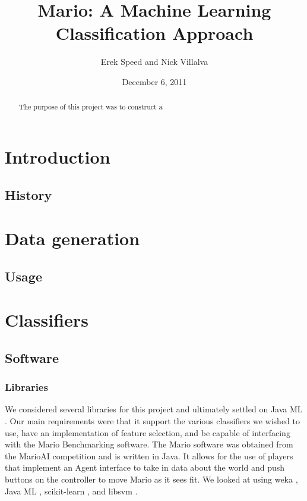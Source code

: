 \documentclass[]{article}   %
\begin{document}
\title{Mario: A Machine Learning Classification Approach}   %

\author{Erek Speed and Nick Villalva}         %
\date{December 6, 2011}    %
\maketitle

\begin{abstract}
 The purpose of this project was to construct a 
\end{abstract}

\section{Introduction}     %
\subsection{History}       %

\section{Data generation}     %
\subsection{Usage}         %

\section{Classifiers}
\subsection{Software}
\subsubsection{Libraries}
We considered several libraries for this project and ultimately settled on Java ML \cite{javaml}. Our main requirements were that it support the various classifiers we wished to use, have an implementation of feature selection, and be capable of interfacing with the Mario Benchmarking \cite{mariobenchmark} software. The Mario software was obtained from the MarioAI competition and is written in Java. It allows for the use of players that implement an Agent interface to take in data about the world and push buttons on the controller to move Mario as it sees fit. We looked at using weka \cite{weka}, Java ML \cite{javaml}, scikit-learn \cite{scikit}, and libsvm \cite{libsvm}. 
\end{document}
